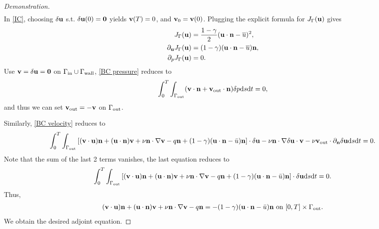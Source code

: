 \documentclass[oneside,11pt]{book}
\numberwithin{equation}{section}
\begin{document}
\begin{proof}[Demonstration]
\begin{align}
    \end{align}
    In \eqref{IC}, choosing $\delta{\bf u}$ s.t. $\delta{\bf u}(0) = {\bf 0}$ yields ${\bf v}(T) = 0$, and ${\bf v}_0 = {\bf v}(0)$. Plugging the explicit formula for $J_\Gamma({\bf u})$ gives
    \begin{align}
        J_\Gamma({\bf u}) &= \frac{1 - \gamma}{2}({\bf u}\cdot{\bf n} - \overline{u})^2,\\
        \partial_{\bf u}J_\Gamma({\bf u}) &= (1 - \gamma)({\bf u}\cdot{\bf n} - \overline{u}){\bf n},\\
        \partial_pJ_\Gamma({\bf u}) &= 0.
    \end{align}
    Use ${\bf v} = \delta{\bf u} = {\bf 0}$ on $\Gamma_{\rm in}\cup\Gamma_{\rm wall}$, \eqref{BC pressure} reduces to
    \begin{align}
        \int_0^T\int_{\Gamma_{\rm out}} ({\bf v}\cdot{\bf n} + {\bf v}_{\rm out}\cdot{\bf n})\delta p{\rm d}s{\rm d}t = 0,
    \end{align}
    and thus we can set ${\bf v}_{\rm out} = -{\bf v}$ on $\Gamma_{\rm out}$.
    
    Similarly, \eqref{BC velocity} reduces to
    \begin{align}
        \int_0^T\int_{\Gamma_{\rm out}} \left[({\bf v}\cdot{\bf u}){\bf n} + ({\bf u}\cdot{\bf n}){\bf v} + \nu{\bf n}\cdot\nabla{\bf v} - q{\bf n} + (1 - \gamma)({\bf u}\cdot{\bf n} - \bar{u}){\bf n}\right]\cdot\delta{\bf u} - \nu{\bf n}\cdot\nabla\delta{\bf u}\cdot{\bf v} - \nu{\bf v}_{\rm out}\cdot\partial_{\bf n}\delta{\bf u}{\rm d}s{\rm d}t = 0.
    \end{align}
    Note that the sum of the last 2 terms vanishes, the last equation reduces to
    \begin{align}
        \int_0^T\int_{\Gamma_{\rm out}} \left[({\bf v}\cdot{\bf u}){\bf n} + ({\bf u}\cdot{\bf n}){\bf v} + \nu{\bf n}\cdot\nabla{\bf v} - q{\bf n} + (1 - \gamma)({\bf u}\cdot{\bf n} - \bar{u}){\bf n}\right]\cdot\delta{\bf u}{\rm d}s{\rm d}t = 0.
    \end{align}
    Thus,
    \begin{align}
        ({\bf v}\cdot{\bf u}){\bf n} + ({\bf u}\cdot{\bf n}){\bf v} + \nu{\bf n}\cdot\nabla{\bf v} - q{\bf n} = -(1 - \gamma)({\bf u}\cdot{\bf n} - \bar{u}){\bf n} \mbox{ on } [0,T]\times\Gamma_{\rm out}.
    \end{align}
    We obtain the desired adjoint equation.
\end{proof}
\end{document}
